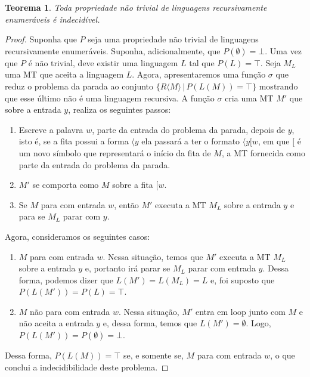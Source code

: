 \documentclass[a4paper]{article}
\newtheorem{Theorem}{Teorema}
\theoremstyle{definition}
\begin{document}
  \begin{Theorem}
    Toda propriedade não trivial de linguagens recursivamente enumeráveis é
    indecidível.
  \end{Theorem}
  \begin{proof}
    Suponha que $P$ seja uma propriedade não trivial de linguagens
    recursivamente enumeráveis. Suponha, adicionalmente, que $P(\emptyset) =
    \bot$. Uma vez que $P$ é não trivial, deve existir uma linguagem $L$ tal que
    $P(L) = \top$. Seja $M_L$ uma MT que aceita a linguagem $L$. Agora,
    apresentaremos uma função $\sigma$ que reduz o problema da parada ao
    conjunto $\{R\langle M \rangle\,|\,P(L(M)) = \top\}$ mostrando que esse
    último não é uma linguagem recursiva. A função $\sigma$ cria uma MT
    $M'$ que sobre a entrada $y$, realiza os seguintes passos:
    \begin{enumerate}
       \item Escreve a palavra $w$, parte da entrada do problema da parada,
         depois de $y$, isto é, se a fita possui a forma $\langle y$ ela passará
         a ter o formato $\langle y \lbrack w $, em que $\lbrack$ é um novo
         símbolo que representará o início da fita de $M$, a MT fornecida como
         parte da entrada do problema da parada.
       \item $M'$ se comporta como $M$ sobre a fita $\lbrack w$.
       \item Se $M$ para com entrada $w$, então $M'$ executa a MT $M_L$ sobre a
         entrada $y$ e para se $M_L$ parar com $y$.
     \end{enumerate}
     Agora, consideramos os seguintes casos:
     \begin{enumerate}
        \item $M$ para com entrada $w$. Nessa situação, temos que $M'$ executa a
          MT $M_L$ sobre a entrada $y$ e, portanto irá parar se $M_L$ parar com
          entrada $y$. Dessa forma, podemos dizer que $L(M') = L(M_L) = L$ e,
          foi suposto que $P(L(M')) = P(L) = \top$.
        \item $M$ não para com entrada $w$. Nessa situação, $M'$ entra em loop
          junto com $M$ e não aceita a entrada $y$ e, dessa forma, temos que
          $L(M') = \emptyset$. Logo, $P(L(M')) = P(\emptyset) = \bot$.
        \end{enumerate}
        Dessa forma, $P(L(M)) = \top$ se, e somente se, $M$ para com entrada
        $w$, o que conclui a indecidibilidade deste problema.
      \end{proof}
\end{document}
